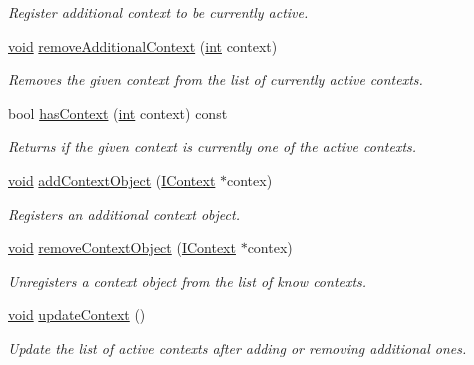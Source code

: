 \begin{DoxyCompactItemize}
\begin{DoxyCompactList}\small\item\em Register additional context to be currently active. \end{DoxyCompactList}\item 
\hyperlink{group___u_a_v_objects_plugin_ga444cf2ff3f0ecbe028adce838d373f5c}{void} \hyperlink{group___core_plugin_ga313953591f64d54fde23de1526ab1f75}{remove\-Additional\-Context} (\hyperlink{ioapi_8h_a787fa3cf048117ba7123753c1e74fcd6}{int} context)
\begin{DoxyCompactList}\small\item\em Removes the given {\itshape context} from the list of currently active contexts. \end{DoxyCompactList}\item 
bool \hyperlink{group___core_plugin_ga8769e5f914220ba8484cf286359e5b8d}{has\-Context} (\hyperlink{ioapi_8h_a787fa3cf048117ba7123753c1e74fcd6}{int} context) const 
\begin{DoxyCompactList}\small\item\em Returns if the given {\itshape context} is currently one of the active contexts. \end{DoxyCompactList}\item 
\hyperlink{group___u_a_v_objects_plugin_ga444cf2ff3f0ecbe028adce838d373f5c}{void} \hyperlink{group___core_plugin_gadb70e979c6c0d4d960b26251bbfc0baa}{add\-Context\-Object} (\hyperlink{class_core_1_1_i_context}{I\-Context} $\ast$contex)
\begin{DoxyCompactList}\small\item\em Registers an additional {\itshape context} object. \end{DoxyCompactList}\item 
\hyperlink{group___u_a_v_objects_plugin_ga444cf2ff3f0ecbe028adce838d373f5c}{void} \hyperlink{group___core_plugin_gacd2df84d0bcf6246537ea1a11bdb9193}{remove\-Context\-Object} (\hyperlink{class_core_1_1_i_context}{I\-Context} $\ast$contex)
\begin{DoxyCompactList}\small\item\em Unregisters a {\itshape context} object from the list of know contexts. \end{DoxyCompactList}\item 
\hyperlink{group___u_a_v_objects_plugin_ga444cf2ff3f0ecbe028adce838d373f5c}{void} \hyperlink{group___core_plugin_ga298e47b094767a344cb746f1a18b5ec2}{update\-Context} ()
\begin{DoxyCompactList}\small\item\em Update the list of active contexts after adding or removing additional ones. \end{DoxyCompactList}\item 

\end{DoxyCompactItemize}

